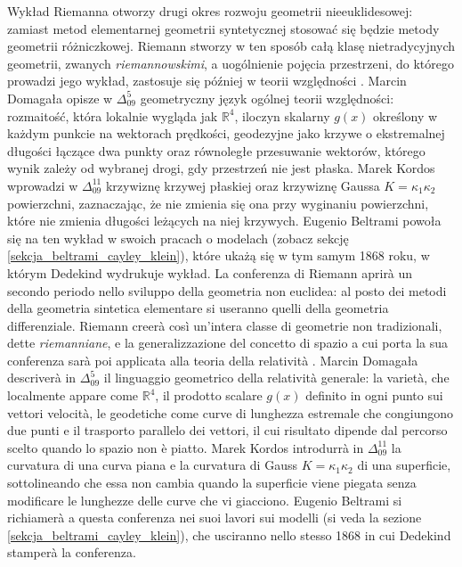 Wykład Riemanna otworzy drugi okres rozwoju geometrii nieeuklidesowej: zamiast metod elementarnej geometrii syntetycznej stosować się będzie metody geometrii różniczkowej. %
Riemann stworzy w ten sposób całą klasę nietradycyjnych geometrii, zwanych \emph{riemannowskimi}, a uogólnienie pojęcia przestrzeni, do którego prowadzi jego wykład, zastosuje się później w teorii względności \cite[s. 288]{eves1_1972}. %
Marcin Domagała opisze w $\Delta_{09}^{5}$ geometryczny język ogólnej teorii względności: rozmaitość, która lokalnie wygląda jak $\mathbb R^4$, iloczyn skalarny $g(x)$ określony w każdym punkcie na wektorach prędkości, geodezyjne jako krzywe o ekstremalnej długości łączące dwa punkty oraz równoległe przesuwanie wektorów, którego wynik zależy od wybranej drogi, gdy przestrzeń nie jest płaska. %
Marek Kordos wprowadzi w $\Delta_{09}^{11}$ krzywiznę krzywej płaskiej oraz krzywiznę Gaussa $K = \kappa_1 \kappa_2$ powierzchni, zaznaczając, że nie zmienia się ona przy wyginaniu powierzchni, które nie zmienia długości leżących na niej krzywych. %
Eugenio Beltrami powoła się na ten wykład w swoich pracach o modelach (zobacz sekcję \ref{sekcja_beltrami_cayley_klein}), które ukażą się w tym samym 1868 roku, w którym Dedekind wydrukuje wykład. %
La conferenza di Riemann aprirà un secondo periodo nello sviluppo della geometria non euclidea: al posto dei metodi della geometria sintetica elementare si useranno quelli della geometria differenziale. %
Riemann creerà così un'intera classe di geometrie non tradizionali, dette \emph{riemanniane}, e la generalizzazione del concetto di spazio a cui porta la sua conferenza sarà poi applicata alla teoria della relatività \cite[p. 288]{eves1_1972}. %
Marcin Domagała descriverà in $\Delta_{09}^{5}$ il linguaggio geometrico della relatività generale: la varietà, che localmente appare come $\mathbb R^4$, il prodotto scalare $g(x)$ definito in ogni punto sui vettori velocità, le geodetiche come curve di lunghezza estremale che congiungono due punti e il trasporto parallelo dei vettori, il cui risultato dipende dal percorso scelto quando lo spazio non è piatto. %
Marek Kordos introdurrà in $\Delta_{09}^{11}$ la curvatura di una curva piana e la curvatura di Gauss $K = \kappa_1 \kappa_2$ di una superficie, sottolineando che essa non cambia quando la superficie viene piegata senza modificare le lunghezze delle curve che vi giacciono. %
Eugenio Beltrami si richiamerà a questa conferenza nei suoi lavori sui modelli (si veda la sezione \ref{sekcja_beltrami_cayley_klein}), che usciranno nello stesso 1868 in cui Dedekind stamperà la conferenza. %

